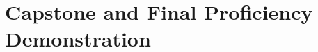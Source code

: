\documentclass[
    12pt,
    a4paper,
    oneside,
    openany
]{book}
\begin{document}




\part{Capstone and Final Proficiency Demonstration}
\end{document}
